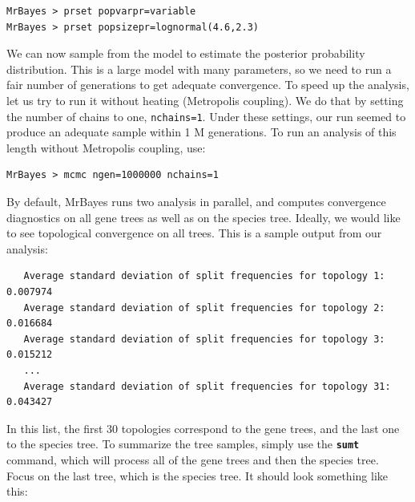 \documentclass[12pt]{book}
\newcommand{\ttt}[1]{\texttt{#1}}
\newcommand{\tb}[1]{\ttt{\textbf{#1}}}
\begin{document}
\begin{singlespacing}
\begin{verbatim}
MrBayes > prset popvarpr=variable
MrBayes > prset popsizepr=lognormal(4.6,2.3)
\end{verbatim}
\end{singlespacing}

We can now sample from the model to estimate the posterior probability distribution. This is a
large model with many parameters, so we need to run a fair number of generations to get adequate
convergence. To speed up the analysis, let us try to run it without heating (Metropolis coupling).
We do that by setting the number of chains to one, \ttt{nchains=1}. Under these settings, our
run seemed to produce an adequate sample within 1 M generations. To run an analysis of this length
without Metropolis coupling, use:

\begin{verbatim}
MrBayes > mcmc ngen=1000000 nchains=1
\end{verbatim}

By default, MrBayes runs two analysis in parallel, and computes convergence diagnostics on all gene
trees as well as on the species tree. Ideally, we would like to see topological convergence on all
trees. This is a sample output from our analysis:

\footnotesize
\begin{singlespacing}
\begin{verbatim}
   Average standard deviation of split frequencies for topology 1: 0.007974
   Average standard deviation of split frequencies for topology 2: 0.016684
   Average standard deviation of split frequencies for topology 3: 0.015212
   ...
   Average standard deviation of split frequencies for topology 31: 0.043427
\end{verbatim}
\end{singlespacing}
\normalsize

In this list, the first 30 topologies correspond to the gene trees, and the last one to the species
tree. To summarize the tree samples, simply use the \tb{sumt} command, which will process all
of the gene trees and then the species tree. Focus on the last tree, which is the species tree. It
should look something like this:
\end{document}

